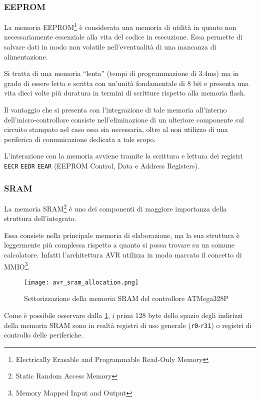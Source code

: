 \subsubsection{EEPROM}

La memoria EEPROM\footnote{Electrically Erasable and Programmable Read-Only Memory} è considerata una memoria di utilità in quanto non necessariamente essenziale alla vita del codice in esecuzione. Essa permette di salvare dati in modo non volatile nell'eventualità di una mancanza di alimentazione.

Si tratta di una memoria ``lenta'' (tempi di programmazione di 3.4ms\cite[tab 8-1]{avr:m328p}) ma in grado di essere letta e scritta con un'unità fondamentale di 8 bit\cite[sec 8.4]{avr:m328p} e presenta una vita dieci volte più duratura in termini di scritture rispetto alla memoria flash.

Il vantaggio che si presenta con l'integrazione di tale memoria all'interno dell'micro-controllore consiste nell'eliminazione di un ulteriore componente sul circuito stampato nel caso essa sia necessaria, oltre al non utilizzo di una periferica di comunicazione dedicata a tale scopo.

L'interazione con la memoria avviene tramite la scrittura e lettura dei registri \texttt{EECR} \texttt{EEDR} \texttt{EEAR} (EEPROM Control, Data e Address Registers)\cite[34]{avr:m328p}.

\subsubsection{SRAM}
La memoria SRAM\footnote{Static Random Access Memory} è uno dei componenti di maggiore importanza della struttura dell'integrato.

Essa consiste nella principale memoria di elaborazione, ma la sua struttura è leggermente più complessa rispetto a quanto si possa trovare su un comune calcolatore.
Infatti l'architettura AVR utilizza in modo marcato il concetto di MMIO\footnote{Memory Mapped Input and Output}.

\begin{figure}[b]
    \centering
    \texttt{[image: avr\_sram\_allocation.png]}
    \caption[Immagine ottenuta dal documento~\cite{avr:m328p}, fig. 8-3]{Settorizzazione della memoria SRAM del controllore ATMega328P\cite[fig 8-3]{avr:m328p}}\label{fig:avr-sram-alloc}
\end{figure}

Come è possibile osservare dalla \cref{fig:avr-sram-alloc}, i primi 128 byte dello spazio degli indirizzi della memoria SRAM sono in realtà registri di uso generale (\texttt{r0}-\texttt{r31}) o registri di controllo delle periferiche.

